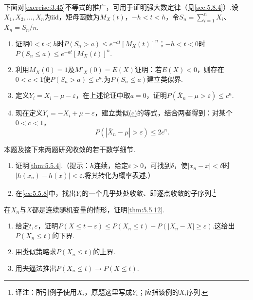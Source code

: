 \begin{exercise}\label{exercise:5.38}
下面对\autoref{exercise:3.45}不等式的推广，可用于证明强大数定律（见\autoref{sec:5.8.4}）.设$X_1,X_2,\ldots,X_n$为iid，矩母函数为$M_X(t)$，$-h<t<h$，令$S_n=\sum_{i=1}^nX_i$、$\bar X_n=S_n/n$.
\begin{enumerate}[label=(\alph*)]
\item 证明$0<t<h$时$P(S_n>a)\le e^{-at}[M_X(t)]^n$；$-h<t<0$时$P(S_n\le a)\le e^{-at}[M_X(t)]^n$.
\item 利用$M_X(0)=1$及$M'_X(0)=E(X)$证明：若$E(X)<0$，则存在$0<c<1$使$P(S_n>a)\le c^n$.为$P(S_n\le a)$建立类似界.
\item{}\label{itm:exercise:5.38:c} 定义$Y_i=X_i-\mu-\varepsilon$，在上述论证中取$a=0$，证明$P(\bar X_n-\mu>\varepsilon)\le c^n$.
\item{}\label{itm:exercise:5.38:d} 现在定义$Y_i=-X_i+\mu-\varepsilon$，建立类似\hyperref[itm:exercise:5.38:c]{(c)}的等式，结合两者得到：对某个$0<c<1$，
$$P(|\bar X_n-\mu|>\varepsilon)\le2c^n.$$
\end{enumerate}
\end{exercise}
\begin{exercise}\label{exercise:5.39}
本题及接下来两题研究收敛的若干数学细节.
\begin{enumerate}[label=(\alph*)]
\item 证明\autoref{thm:5.5.4}.（提示：$h$连续，给定$\varepsilon>0$，可找到$\delta$，使$|x_n-x|<\delta$时$|h(x_n)-h(x)|<\varepsilon$.将其转化为概率表述.）
\item 在\autoref{ex:5.5.8}中，找出$Y_i$的一个几乎处处收敛、即逐点收敛的子序列.\footnote{译注：所引例子使用$X_i$，原题这里写成$Y_i$；应指该例的$X_i$序列.}
\end{enumerate}
\end{exercise}
\begin{exercise}\label{exercise:5.40}
在$X_n$与$X$都是连续随机变量的情形，证明\autoref{thm:5.5.12}.
\begin{enumerate}[label=(\alph*)]
\item 给定$t,\varepsilon$，证明$P(X\le t-\varepsilon)\le P(X_n\le t)+P(|X_n-X|\ge\varepsilon)$.这给出$P(X_n\le t)$的下界.
\item 用类似策略求$P(X_n\le t)$的上界.
\item 用夹逼法推出$P(X_n\le t)\to P(X\le t)$.
\end{enumerate}
\end{exercise}
